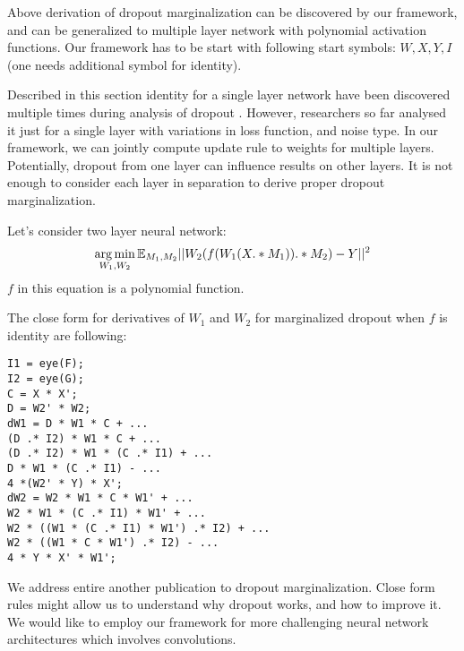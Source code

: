 Above derivation of dropout marginalization can be discovered by our framework, and can be generalized
to multiple layer network with polynomial activation functions. Our framework
has to be start with following start symbols: $W, X, Y, I$ (one needs additional symbol for identity).


Described in this section identity for a single layer network have been discovered multiple times during
analysis of dropout \cite{chen2013learning, chen2012marginalized, maaten2013learning}. 
However, researchers so far analysed it just for a single layer with variations in loss function, and noise type.
In our framework, we can jointly compute update rule to weights for multiple layers. 
Potentially, dropout from one layer can influence results on other layers. It is not enough
to consider each layer in separation to derive proper dropout marginalization.


Let's consider two layer neural network:
\begin{equation*}
  \operatorname*{arg\,min}_{W_1, W_2} \mathbb{E}_{M_1, M_2} ||W_2(f(W_1(X .* M_1)) .* M_2) - Y||^2
\end{equation*}
$f$ in this equation is a polynomial function. 

The close form for derivatives of $W_1$ and $W_2$ for marginalized 
dropout when $f$ is identity are following:
\begin{lstlisting}
I1 = eye(F);
I2 = eye(G);
C = X * X';
D = W2' * W2;
dW1 = D * W1 * C + ...
(D .* I2) * W1 * C + ...
(D .* I2) * W1 * (C .* I1) + ...
D * W1 * (C .* I1) - ...
4 *(W2' * Y) * X'; 
dW2 = W2 * W1 * C * W1' + ...
W2 * W1 * (C .* I1) * W1' + ...
W2 * ((W1 * (C .* I1) * W1') .* I2) + ...
W2 * ((W1 * C * W1') .* I2) - ...
4 * Y * X' * W1';
\end{lstlisting}

We address entire another publication to dropout marginalization. Close form rules might
allow us to understand why dropout works, and how to improve it. We would like to 
employ our framework for more challenging neural network architectures which involves
convolutions.
